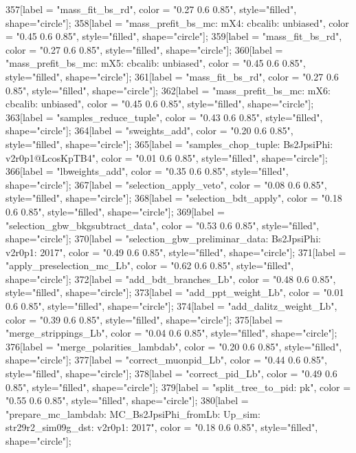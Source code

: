{	357[label = "mass_fit_bs_rd", color = "0.27 0.6 0.85", style="filled", shape="circle"];
	358[label = "mass_prefit_bs_mc\nmassbin: mX4\nmassmodel: cbcalib\ntrigger: unbiased", color = "0.45 0.6 0.85", style="filled", shape="circle"];
	359[label = "mass_fit_bs_rd", color = "0.27 0.6 0.85", style="filled", shape="circle"];
	360[label = "mass_prefit_bs_mc\nmassbin: mX5\nmassmodel: cbcalib\ntrigger: unbiased", color = "0.45 0.6 0.85", style="filled", shape="circle"];
	361[label = "mass_fit_bs_rd", color = "0.27 0.6 0.85", style="filled", shape="circle"];
	362[label = "mass_prefit_bs_mc\nmassbin: mX6\nmassmodel: cbcalib\ntrigger: unbiased", color = "0.45 0.6 0.85", style="filled", shape="circle"];
	363[label = "samples_reduce_tuple", color = "0.43 0.6 0.85", style="filled", shape="circle"];
	364[label = "sweights_add", color = "0.20 0.6 0.85", style="filled", shape="circle"];
	365[label = "samples_chop_tuple\nmode: Bs2JpsiPhi\nversion: v2r0p1@LcosKpTB4", color = "0.01 0.6 0.85", style="filled", shape="circle"];
	366[label = "lbweights_add", color = "0.35 0.6 0.85", style="filled", shape="circle"];
	367[label = "selection_apply_veto", color = "0.08 0.6 0.85", style="filled", shape="circle"];
	368[label = "selection_bdt_apply", color = "0.18 0.6 0.85", style="filled", shape="circle"];
	369[label = "selection_gbw_bkgsubtract_data", color = "0.53 0.6 0.85", style="filled", shape="circle"];
	370[label = "selection_gbw_preliminar_data\nmode: Bs2JpsiPhi\nversion: v2r0p1\nyear: 2017", color = "0.49 0.6 0.85", style="filled", shape="circle"];
	371[label = "apply_preselection_mc_Lb", color = "0.62 0.6 0.85", style="filled", shape="circle"];
	372[label = "add_bdt_branches_Lb", color = "0.48 0.6 0.85", style="filled", shape="circle"];
	373[label = "add_ppt_weight_Lb", color = "0.01 0.6 0.85", style="filled", shape="circle"];
	374[label = "add_dalitz_weight_Lb", color = "0.39 0.6 0.85", style="filled", shape="circle"];
	375[label = "merge_strippings_Lb", color = "0.04 0.6 0.85", style="filled", shape="circle"];
	376[label = "merge_polarities_lambdab", color = "0.20 0.6 0.85", style="filled", shape="circle"];
	377[label = "correct_muonpid_Lb", color = "0.44 0.6 0.85", style="filled", shape="circle"];
	378[label = "correct_pid_Lb", color = "0.49 0.6 0.85", style="filled", shape="circle"];
	379[label = "split_tree_to_pid\npkkp: pk", color = "0.55 0.6 0.85", style="filled", shape="circle"];
	380[label = "prepare_mc_lambdab\nmode: MC_Bs2JpsiPhi_fromLb\npolarity: Up\nstrip_sim: str29r2_sim09g_dst\nversion: v2r0p1\nyear: 2017", color = "0.18 0.6 0.85", style="filled", shape="circle"];
}
